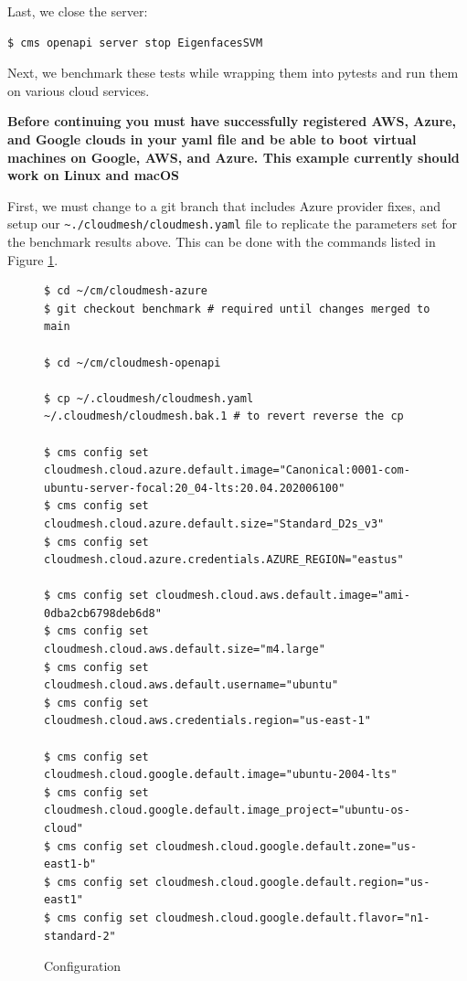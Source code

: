 Last, we close the server:

\begin{verbatim}
$ cms openapi server stop EigenfacesSVM
\end{verbatim}

Next, we benchmark these tests while wrapping them into pytests and run
them on various cloud services.

\textbf{Before continuing you must have successfully registered AWS,
Azure, and Google clouds in your yaml file and be able to boot virtual
machines on Google, AWS, and Azure. This example currently should work
on Linux and macOS}

First, we must change to a git branch that includes Azure provider
fixes, and setup our \verb|~./cloudmesh/cloudmesh.yaml| file to
replicate the parameters set for the benchmark results above. This can
be done with the commands listed in Figure \ref{fig:config}.


\begin{figure}[htb]

\begin{verbatim}
$ cd ~/cm/cloudmesh-azure 
$ git checkout benchmark # required until changes merged to main

$ cd ~/cm/cloudmesh-openapi

$ cp ~/.cloudmesh/cloudmesh.yaml ~/.cloudmesh/cloudmesh.bak.1 # to revert reverse the cp

$ cms config set cloudmesh.cloud.azure.default.image="Canonical:0001-com-ubuntu-server-focal:20_04-lts:20.04.202006100"
$ cms config set cloudmesh.cloud.azure.default.size="Standard_D2s_v3"
$ cms config set cloudmesh.cloud.azure.credentials.AZURE_REGION="eastus"

$ cms config set cloudmesh.cloud.aws.default.image="ami-0dba2cb6798deb6d8"
$ cms config set cloudmesh.cloud.aws.default.size="m4.large"
$ cms config set cloudmesh.cloud.aws.default.username="ubuntu"
$ cms config set cloudmesh.cloud.aws.credentials.region="us-east-1"

$ cms config set cloudmesh.cloud.google.default.image="ubuntu-2004-lts"
$ cms config set cloudmesh.cloud.google.default.image_project="ubuntu-os-cloud"
$ cms config set cloudmesh.cloud.google.default.zone="us-east1-b"
$ cms config set cloudmesh.cloud.google.default.region="us-east1"
$ cms config set cloudmesh.cloud.google.default.flavor="n1-standard-2"
\end{verbatim}

  \caption{Configuration}
  \label{fig:config}
  \end{figure}

